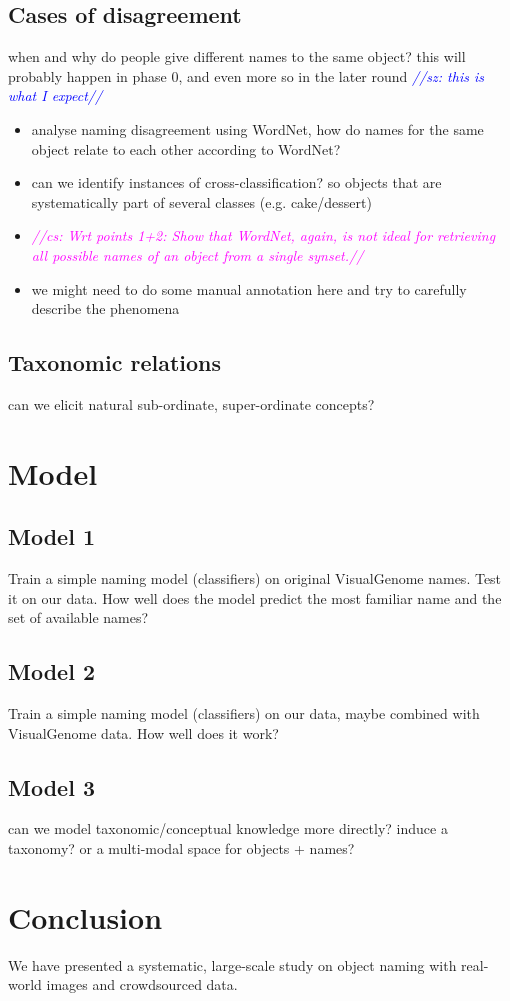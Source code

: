 \documentclass[11pt]{article}
\newcommand{\sz}[1]{\textcolor{blue}{\emph{//sz: #1//}}}
\newcommand{\cs}[1]{\textcolor{Fuchsia}{\emph{//cs: #1//}}}
\begin{document}
\subsection{Cases of disagreement}

when and why do people give different names to the same object? this will probably happen in phase 0, and even more so in the later round \sz{this is what I expect}

\begin{itemize}
\item  analyse naming disagreement using WordNet, how do names for the same object relate to each other according to WordNet?
\item can we identify instances of cross-classification? so objects that are systematically part of several classes (e.g. cake/dessert)
\item \cs{Wrt points 1+2: Show that WordNet, again, is not ideal for retrieving all possible names of an object from a single synset.}
\item we might need to do some manual annotation here and try to carefully describe the phenomena
\end{itemize}

\subsection{Taxonomic relations}

can we elicit natural sub-ordinate, super-ordinate concepts?

\section{Model}

\subsection{Model 1}
Train a simple naming model (classifiers) on original VisualGenome names. Test it on our data. How well does the model predict the most familiar name and the set of available names?

\subsection{Model 2}
Train a simple naming model (classifiers) on our data, maybe combined with VisualGenome data. How well does it work?

\subsection{Model 3}

can we model taxonomic/conceptual knowledge more directly? induce a taxonomy? or a multi-modal space for objects + names?

\section{Conclusion}

We have presented a systematic, large-scale study on object naming with real-world images and crowdsourced data.



\end{document}
